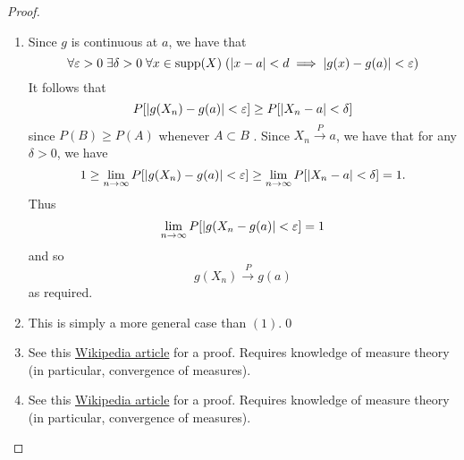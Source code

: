 \documentclass[notoc,notitlepage]{tufte-book}
\DeclareMathOperator{\supp}{supp }
\newcommand{\convp}{\overset{P}{\to}}
\begin{document}
\begin{proof}
  \begin{enumerate}
    \item Since $g$ is continuous at $a$, we have that
      \begin{equation*}
        \forall \epsilon > 0 \; \exists \delta > 0 \; \forall x \in \supp(X) \; ( \abs{x -a} < d \implies \abs{g(x) - g(a)} < \epsilon )
      \end{equation*}
      It follows that
      \begin{equation*}
        P[ \left| g(X_n ) - g(a)\right| < \varepsilon ] \geq P[ \left|X_n - a\right| < \delta ]
      \end{equation*}
      since $P(B) \geq P(A)$ whenever $A \subset B$ . Since $X_n \convp a$, we have that for any $\delta > 0$, we have
      \begin{equation*}
        1 \geq \lim_{n \to \infty} P[ \left|g(X_n) - g(a)\right| < \varepsilon ] \geq \lim_{n \to \infty} P[ \left|X_n - a\right| < \delta ] = 1.
      \end{equation*}
      Thus
      \begin{equation*}
      \lim_{n \to \infty} P[ \left|g(X_n - g(a)\right| < \varepsilon ] = 1
      \end{equation*}
      and so
      \begin{equation*}
        g(X_n) \convp g(a)
      \end{equation*}
      as required.

    \item This is simply a more general case than $(1)$.\qed

    \item See this \href{https://en.wikipedia.org/wiki/Slutsky\'s_theorem}{Wikipedia article} for a proof. Requires knowledge of measure theory (in particular, convergence of measures).
      
    \item See this \href{https://en.wikipedia.org/wiki/Continuous_mapping_theorem}{Wikipedia article} for a proof. Requires knowledge of measure theory (in particular, convergence of measures).
  \end{enumerate}
\end{proof}
\end{document}
